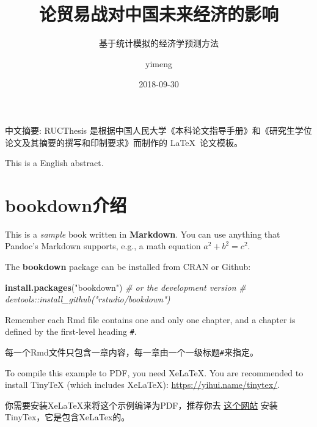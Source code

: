 \documentclass[a4paper,bachelor]{ructhesis}
\title{论贸易战对中国未来经济的影响} %
\author{yimeng} %
\date{2018-09-30} %
\subtitle{基于统计模拟的经济学预测方法} %
\newenvironment{Shaded}{\begin{snugshade}}{\end{snugshade}}
\newcommand{\KeywordTok}[1]{\textcolor[rgb]{0.13,0.29,0.53}{\textbf{#1}}}
\newcommand{\StringTok}[1]{\textcolor[rgb]{0.31,0.60,0.02}{#1}}
\newcommand{\CommentTok}[1]{\textcolor[rgb]{0.56,0.35,0.01}{\textit{#1}}}
\newcommand{\NormalTok}[1]{#1}
\theoremstyle{definition}
\theoremstyle{definition}
\theoremstyle{definition}
\theoremstyle{remark}
\begin{document}
\maketitle


% 
\begin{abstractzh}
  中文摘要: RUCThesis
  是根据中国人民大学《本科论文指导手册》和《研究生学位论文及其摘要的撰写和印制要求》而制作的
  \LaTeX~论文模板。
\end{abstractzh}

% 
\begin{abstracten}
  This is a English abstract.
\end{abstracten}


\frontmatter

\tableofcontents
\listoffigures
\listoftables


\mainmatter\clearpage
\pagestyle{fancy}

\hypertarget{bookdown}{%
\chapter{bookdown介绍}\label{bookdown}}

This is a \emph{sample} book written in \textbf{Markdown}. You can use
anything that Pandoc's Markdown supports, e.g., a math equation
\(a^2 + b^2 = c^2\).

The \textbf{bookdown} package can be installed from CRAN or Github:

\begin{Shaded}
\begin{Highlighting}[]
\KeywordTok{install.packages}\NormalTok{(}\StringTok{"bookdown"}\NormalTok{)}
\CommentTok{# or the development version}
\CommentTok{# devtools::install_github("rstudio/bookdown")}
\end{Highlighting}
\end{Shaded}

Remember each Rmd file contains one and only one chapter, and a chapter
is defined by the first-level heading \texttt{\#}.

每一个Rmd文件只包含一章内容，每一章由一个一级标题\texttt{\#}来指定。

To compile this example to PDF, you need XeLaTeX. You are recommended to
install TinyTeX (which includes XeLaTeX):
\url{https://yihui.name/tinytex/}.

你需要安装XeLaTeX来将这个示例编译为PDF，推荐你去
\href{https://yihui.name/tinytex/}{这个网站}
安装TinyTex，它是包含XeLaTex的。
\end{document}
